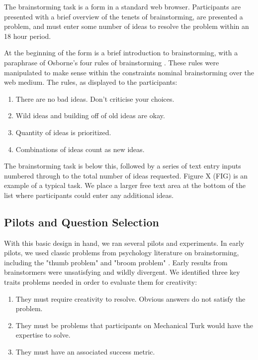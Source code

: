 The brainstorming task is a form in a standard web browser. Participants are presented with a brief overview of the tenets of brainstorming, are presented a problem, and must enter some number of ideas to resolve the problem within an 18 hour period.

At the beginning of the form is a brief introduction to brainstorming, with a paraphrase of Osborne's four rules of brainstorming \cite{osborn_applied_1957}. These rules were manipulated to make sense within the constraints nominal brainstorming over the web medium. The rules, as displayed to the participants:

\begin{enumerate}
\item There are no bad ideas. Don't criticise your choices.
\item Wild ideas and building off of old ideas are okay.
\item Quantity of ideas is prioritized.
\item Combinations of ideas count as new ideas.
\end{enumerate}

The brainstorming task is below this, followed by a series of text entry inputs numbered through to the total number of ideas requested. Figure X (FIG) is an example of a typical task. We place a larger free text area at the bottom of the list where participants could enter any additional ideas.

\subsection{Pilots and Question Selection}

With this basic design in hand, we ran several pilots and experiments. In early pilots, we used classic problems from psychology literature on brainstorming, including the "thumb problem" and "broom problem" \cite{isaksen_review_1997}. Early results from brainstormers were unsatisfying and wildly divergent. We identified three key traits problems needed in order to evaluate them for creativity:

\begin{enumerate}
\item They must require creativity to resolve. Obvious answers do not satisfy the problem.
\item They must be problems that participants on Mechanical Turk would have the expertise to solve.
\item They must have an associated success metric.
\end{enumerate}

